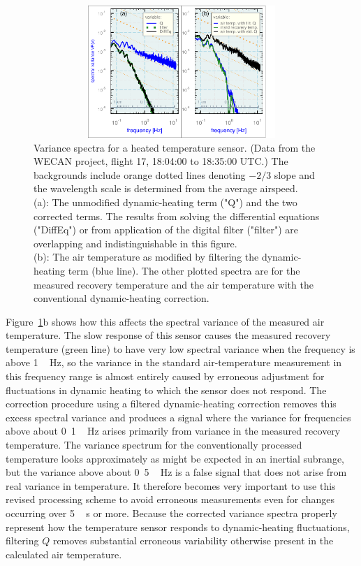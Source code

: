\documentclass[amt, manuscript]{copernicus}
\begin{document}
\begin{figure}

\begin{center}\includegraphics[width=12cm,height=5cm]{figure/fig7} \end{center}

\caption[Variance spectra for the heated temperature sensor: The unmodified dynamic-heating
term and two filtered terms. Also, the air temperature as modified
by filtering the dynamic-heating term.]{Variance spectra for a heated temperature sensor. (Data from
the WECAN project, flight 17, 18:04:00 to 18:35:00 UTC.) 
The backgrounds include orange dotted lines denoting $-2/3$ slope and the wavelength scale is determined from the average airspeed.\protect \\
(a): The unmodified dynamic-heating term ("Q") and the two
corrected terms. The results from solving the differential equations
("DiffEq") or from application of the digital filter ("filter")
are overlapping and indistinguishable in this figure.\protect \\
(b): The air temperature as modified by filtering the dynamic-heating
term (blue line). The other plotted spectra are for the measured recovery
temperature and the air temperature with the conventional dynamic-heating
correction.{\label{fig:HarcoQ}}}
\end{figure}

Figure~\ref{fig:HarcoQ}b shows how this affects the spectral variance of
the measured air temperature. The slow response of this sensor causes
the measured recovery temperature (green line) to have very low spectral
variance when the frequency is above \unit{1\,Hz}, so the variance in
the standard air-temperature measurement in this frequency range is
almost entirely caused by erroneous adjustment for fluctuations in
dynamic heating to which the sensor does not respond. The correction
procedure using a filtered dynamic-heating correction removes this
excess spectral variance and produces a signal where the variance for
frequencies above about \unit{0.1\,Hz} arises primarily from variance in
the measured recovery temperature. The variance spectrum for the
conventionally processed temperature looks approximately as might be
expected in an inertial subrange, but the variance above about
\unit{0.5\,Hz} is a false signal that does not arise from real variance
in temperature. It therefore becomes very important to use this revised
processing scheme to avoid erroneous measurements even for changes
occurring over \unit{5\,s} or more. Because the corrected variance
spectra properly represent how the temperature sensor responds to
dynamic-heating fluctuations, filtering \(Q\) removes substantial
erroneous variability otherwise present in the calculated air
temperature.
\end{document}
